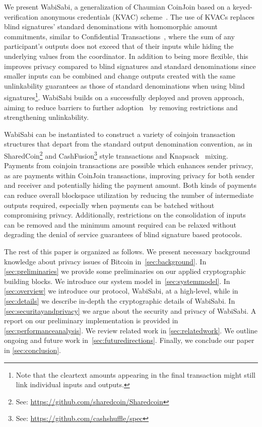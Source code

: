 \documentclass[a4paper]{article}
\begin{document}
We present WabiSabi, a generalization of Chaumian CoinJoin based on a keyed-verification anonymous credentials (KVAC) scheme~\cite{chase2019signal}. The use of KVACs replaces blind signatures' standard denominations with homomorphic amount commitments, similar to Confidential Transactions~\cite{maxwell2016confidential}, where the sum of any participant's outputs does not exceed that of their inputs while hiding the underlying values from the coordinator. In addition to being more flexible, this improves privacy compared to blind signatures and standard denominations since smaller inputs can be combined and change outputs created with the same unlinkability guarantees as those of standard denominations when using blind signatures\footnote{Note that the cleartext amounts appearing in the final transaction might still link individual inputs and outputs.}. WabiSabi builds on a successfully deployed and proven approach, aiming to reduce barriers to further adoption~\cite{dingledine2006anonymity} by removing restrictions and strengthening unlinkability.

WabiSabi can be instantiated to construct a variety of coinjoin transaction structures that depart from the standard output denomination convention, as in SharedCoin\footnote{See: \url{https://github.com/sharedcoin/Sharedcoin}} and CashFusion\footnote{See: \url{https://github.com/cashshuffle/spec}} style transactions and Knapsack~\cite{maurer2017anonymous} mixing. Payments from coinjoin transactions are possible which enhances sender privacy, as are payments within CoinJoin transactions, improving privacy for both sender and receiver and potentially hiding the payment amount. Both kinds of payments can reduce overall blockspace utilization by reducing the number of intermediate outputs required, especially when payments can be batched without compromising privacy. Additionally, restrictions on the consolidation of inputs can be removed and the minimum amount required can be relaxed without degrading the denial of service guarantees of blind signature based protocols.

The rest of this paper is organized as follows. We present necessary background knowledge about privacy issues of Bitcoin in~\cref{sec:background}. In \cref{sec:preliminaries} we provide some preliminaries on our applied cryptographic building blocks. We introduce our system model in~\cref{sec:systemmodel}. In \cref{sec:overview} we introduce our protocol, WabiSabi, at a high-level, while in \cref{sec:details} we describe in-depth the cryptographic details of WabiSabi. In \cref{sec:securitayandprivacy} we argue about the security and privacy of WabiSabi. A report on our preliminary implementation is provided in \cref{sec:performanceanalysis}. We review related work in \cref{sec:relatedwork}. We outline ongoing and future work in~\cref{sec:futuredirections}. Finally, we conclude our paper in \cref{sec:conclusion}.
\end{document}

